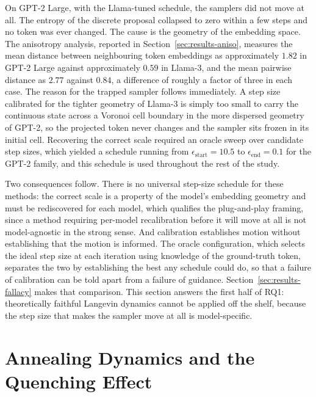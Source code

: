 On GPT-2 Large, with the Llama-tuned schedule, the samplers did not move at all. The entropy of the discrete proposal collapsed to zero within a few steps and no token was ever changed. The cause is the geometry of the embedding space. The anisotropy analysis, reported in Section~\ref{sec:results-aniso}, measures the mean distance between neighbouring token embeddings as approximately $1.82$ in GPT-2 Large against approximately $0.59$ in Llama-3, and the mean pairwise distance as $2.77$ against $0.84$, a difference of roughly a factor of three in each case.
The reason for the trapped sampler follows immediately. A step size calibrated for the tighter geometry of Llama-3 is simply too small to carry the continuous state across a Voronoi cell boundary in the more dispersed geometry of GPT-2, so the projected token never changes and the sampler sits frozen in its initial cell. Recovering the correct scale required an oracle sweep over candidate step sizes, which yielded a schedule running from $\epsilon_{\text{start}} = 10.5$ to $\epsilon_{\text{end}} = 0.1$ for the GPT-2 family, and this schedule is used throughout the rest of the study.

Two consequences follow. There is no universal step-size schedule for these methods: the correct scale is a property of the model's embedding geometry and must be rediscovered for each model, which qualifies the plug-and-play framing, since a method requiring per-model recalibration before it will move at all is not model-agnostic in the strong sense. And calibration establishes motion without establishing that the motion is informed. The oracle configuration, which selects the ideal step size at each iteration using knowledge of the ground-truth token, separates the two by establishing the best any schedule could do, so that a failure of calibration can be told apart from a failure of guidance. Section~\ref{sec:results-fallacy} makes that comparison. This section answers the first half of RQ1: theoretically faithful Langevin dynamics cannot be applied off the shelf, because the step size that makes the sampler move at all is model-specific.

\section{Annealing Dynamics and the Quenching Effect}
\label{sec:results-quench}

